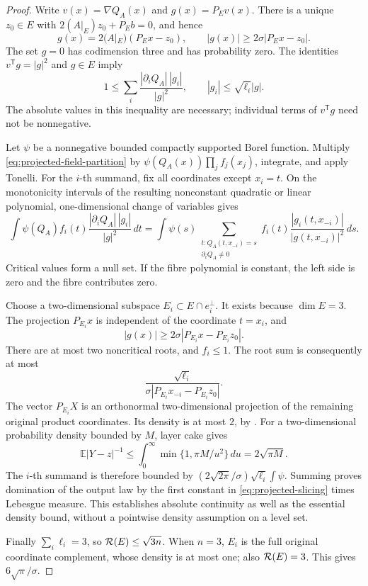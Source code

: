 \begin{proof}
Write \(v(x)=\nabla Q_A(x)\) and \(g(x)=P_Ev(x)\).
There is a unique \(z_0\in E\) with
\(2(A|_E)z_0+P_Eb=0\), and hence
\[
 g(x)=2(A|_E)(P_Ex-z_0),\qquad
 |g(x)|\geq2\sigma|P_Ex-z_0|.
\]
The set \(g=0\) has codimension three and has probability zero.
The identities \(v^{\mathsf T}g=|g|^2\) and \(g\in E\) imply
\begin{equation}
 1\leq\sum_i\frac{|\partial_iQ_A|\,|g_i|}{|g|^2},
 \qquad |g_i|\leq\sqrt{\ell_i}|g|.
 \label{eq:projected-field-partition}
\end{equation}
The absolute values in this inequality are necessary; individual
terms of \(v^{\mathsf T}g\) need not be nonnegative.

Let \(\psi\) be a nonnegative bounded compactly supported
Borel function.  Multiply \eqref{eq:projected-field-partition}
by \(\psi(Q_A(x))\prod_jf_j(x_j)\), integrate, and apply
Tonelli.  For the \(i\)-th summand, fix all coordinates except
\(x_i=t\).  On the monotonicity intervals of the resulting
nonconstant quadratic or linear polynomial, one-dimensional
change of variables gives
\[
 \int \psi(Q_A)f_i(t)
       \frac{|\partial_iQ_A|\,|g_i|}{|g|^2}\,dt
 =
 \int\psi(s)
 \sum_{\substack{t:Q_A(t,x_{-i})=s\\ \partial_iQ_A\ne0}}
 f_i(t)\frac{|g_i(t,x_{-i})|}{|g(t,x_{-i})|^2}\,ds .
\]
Critical values form a null set.  If the fibre polynomial is
constant, the left side is zero and the fibre contributes zero.

Choose a two-dimensional subspace \(E_i\subset E\cap e_i^\perp\).
It exists because \(\dim E=3\).  The projection
\(P_{E_i}x\) is independent of the coordinate \(t=x_i\), and
\[
 |g(x)|\geq2\sigma|P_{E_i}x-P_{E_i}z_0|.
\]
There are at most two noncritical roots, and \(f_i\leq1\).
The root sum is consequently at most
\[
 \frac{\sqrt{\ell_i}}
 {\sigma|P_{E_i}x_{-i}-P_{E_i}z_0|}.
\]
The vector \(P_{E_i}X\) is an orthonormal two-dimensional
projection of the remaining original product coordinates.
Its density is at most \(2\), by
\citet[Theorem~1.1]{LPP2016}.
For a two-dimensional probability density bounded by \(M\),
layer cake gives
\[
 \mathbb E|Y-z|^{-1}
 \leq\int_0^\infty\min\{1,\pi M/u^2\}\,du
 =2\sqrt{\pi M}.
\]
The \(i\)-th summand is therefore bounded by
\((2\sqrt{2\pi}/\sigma)\sqrt{\ell_i}\int\psi\).
Summing proves domination of the output law by the first
constant in \eqref{eq:projected-slicing} times Lebesgue
measure.  This establishes absolute continuity as well as
the essential density bound, without a pointwise density
assumption on a level set.

Finally \(\sum_i\ell_i=3\), so
\({\cal R}(E)\leq\sqrt{3n}\).
When \(n=3\), \(E_i\) is the full original coordinate
complement, whose density is at most one; also
\({\cal R}(E)=3\).  This gives \(6\sqrt\pi/\sigma\).
\end{proof}

